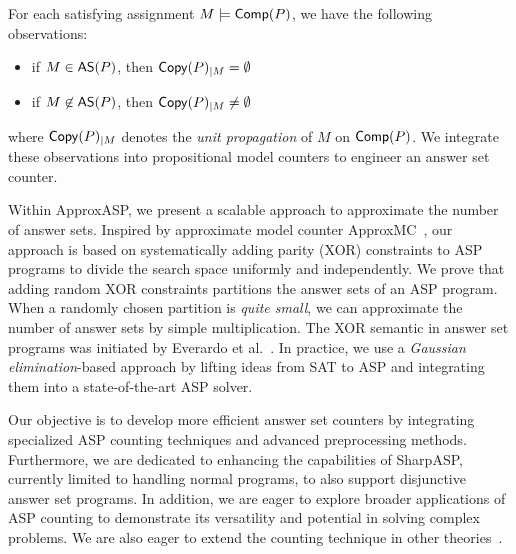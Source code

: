 For each satisfying assignment $M \models \mathsf{Comp}(P)$, we have the following observations:
\begin{itemize}
    \item if $M \in \mathsf{AS}(P)$, then $\mathsf{Copy}(P)_{|M} = \emptyset$
    \item if $M \not\in \mathsf{AS}(P)$, then $\mathsf{Copy}(P)_{|M} \neq \emptyset$
\end{itemize}
where $\mathsf{Copy}(P)_{|M}$ denotes the {\em unit propagation} of $M$ on $\mathsf{Comp}(P)$. We integrate these observations into propositional model counters to engineer an answer set counter.




Within ApproxASP, we present a scalable approach to approximate the number of answer sets.
Inspired by approximate model counter ApproxMC~\cite{CMV2013}, our approach is based on systematically adding parity (XOR) constraints to
ASP programs to divide the search space uniformly and independently. We prove that adding random XOR constraints partitions the 
answer sets of an ASP program. 
When a randomly chosen partition is {\em quite small}, we can approximate the number of answer sets by simple multiplication. 
The XOR semantic in answer set programs was initiated by Everardo et al.~\cite{EJKS2019}.
In practice, we use a {\em Gaussian
elimination}-based approach by lifting ideas from SAT to ASP and
integrating them into a state-of-the-art ASP solver.


Our objective is to develop more efficient answer set counters by integrating specialized ASP counting techniques and advanced preprocessing methods. Furthermore, we are dedicated to enhancing the capabilities of SharpASP, currently limited to handling normal programs, to also support disjunctive answer set programs. In addition, we are eager to explore broader applications of ASP counting to demonstrate its versatility and potential in solving complex problems. We are also eager to extend the counting technique in other theories~\cite{KM2024}.